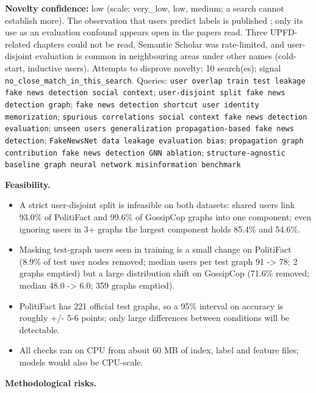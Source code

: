 \documentclass[11pt,a4paper]{article}
\begin{document}
\textbf{Novelty confidence:} low (scale: very\_low, low, medium; a search cannot establish more). The observation that users predict labels is published \cite{jeong2022hgfnd}; only its use as an evaluation confound appears open in the papers read. Three UPFD-related chapters could not be read, Semantic Scholar was rate-limited, and user-disjoint evaluation is common in neighbouring areas under other names (cold-start, inductive users).
Attempts to disprove novelty: 10 search(es); signal \texttt{no\_close\_match\_in\_this\_search}. Queries: \texttt{user overlap train test leakage fake news detection social context}; \texttt{user-disjoint split fake news detection graph}; \texttt{fake news detection shortcut user identity memorization}; \texttt{spurious correlations social context fake news detection evaluation}; \texttt{unseen users generalization propagation-based fake news detection}; \texttt{FakeNewsNet data leakage evaluation bias}; \texttt{propagation graph contribution fake news detection GNN ablation}; \texttt{structure-agnostic baseline graph neural network misinformation benchmark}

\textbf{Feasibility.}
\begin{itemize}
\item [V] A strict user-disjoint split is infeasible on both datasets: shared users link 93.0\% of PolitiFact and 99.6\% of GossipCop graphs into one component; even ignoring users in 3+ graphs the largest component holds 85.4\% and 54.6\%.
\item [V] Masking test-graph users seen in training is a small change on PolitiFact (8.9\% of test user nodes removed; median users per test graph 91 -> 78; 2 graphs emptied) but a large distribution shift on GossipCop (71.6\% removed; median 48.0 -> 6.0; 359 graphs emptied).
\item [E] PolitiFact has 221 official test graphs, so a 95\% interval on accuracy is roughly +/- 5-6 points; only large differences between conditions will be detectable.
\item [V] All checks ran on CPU from about 60 MB of index, label and feature files; models would also be CPU-scale.
\end{itemize}

\textbf{Methodological risks.}
\end{document}

